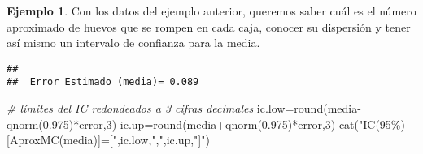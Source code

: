 \documentclass[
]{book}
\newenvironment{Shaded}{\begin{snugshade}}{\end{snugshade}}
\newcommand{\CommentTok}[1]{\textcolor[rgb]{0.56,0.35,0.01}{\textit{#1}}}
\newcommand{\DecValTok}[1]{\textcolor[rgb]{0.00,0.00,0.81}{#1}}
\newcommand{\FloatTok}[1]{\textcolor[rgb]{0.00,0.00,0.81}{#1}}
\newcommand{\FunctionTok}[1]{\textcolor[rgb]{0.00,0.00,0.00}{#1}}
\newcommand{\NormalTok}[1]{#1}
\newcommand{\OtherTok}[1]{\textcolor[rgb]{0.56,0.35,0.01}{#1}}
\newcommand{\SpecialCharTok}[1]{\textcolor[rgb]{0.00,0.00,0.00}{#1}}
\newcommand{\StringTok}[1]{\textcolor[rgb]{0.31,0.60,0.02}{#1}}
\theoremstyle{definition}
\theoremstyle{definition}
\newtheorem{example}{Ejemplo}[chapter]
\theoremstyle{definition}
\theoremstyle{definition}
\theoremstyle{remark}
\begin{document}
\begin{example}
Con los datos del ejemplo anterior, queremos saber cuál es el número aproximado de huevos que se rompen en cada caja, conocer su dispersión y tener así mismo un intervalo de confianza para la media.
\end{example}

\begin{Shaded}
\end{Shaded}

\begin{verbatim}
## 
##  Error Estimado (media)= 0.089
\end{verbatim}

\begin{Shaded}
\begin{Highlighting}[]
\CommentTok{\# límites del IC redondeados a 3 cifras decimales}
\NormalTok{ic.low}\OtherTok{=}\FunctionTok{round}\NormalTok{(media}\SpecialCharTok{{-}}\FunctionTok{qnorm}\NormalTok{(}\FloatTok{0.975}\NormalTok{)}\SpecialCharTok{*}\NormalTok{error,}\DecValTok{3}\NormalTok{)}
\NormalTok{ic.up}\OtherTok{=}\FunctionTok{round}\NormalTok{(media}\SpecialCharTok{+}\FunctionTok{qnorm}\NormalTok{(}\FloatTok{0.975}\NormalTok{)}\SpecialCharTok{*}\NormalTok{error,}\DecValTok{3}\NormalTok{)}
\FunctionTok{cat}\NormalTok{(}\StringTok{"IC(95\%)[AproxMC(media)]=["}\NormalTok{,ic.low,}\StringTok{","}\NormalTok{,ic.up,}\StringTok{"]"}\NormalTok{)}
\end{Highlighting}
\end{Shaded}
\end{document}
